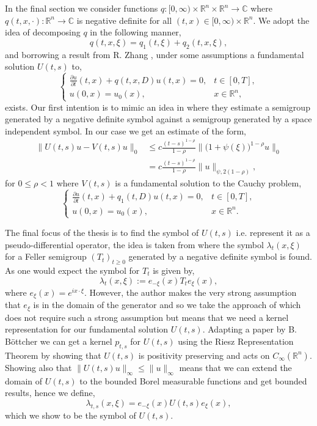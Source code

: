 \documentclass[a4paper, 12pt]{report}
\theoremstyle{cor}
\theoremstyle{remark}
\theoremstyle{definition}
\begin{document}
In the final section we consider functions $q : [0, \infty) \times \mathbb{R}^n \times \mathbb{R}^n \to \mathbb{C}$ where $q(t, x, \cdot) : \mathbb{R}^n \to \mathbb{C}$ is negative definite for all $(t, x) \in [0, \infty) \times \mathbb{R}^n$.  We adopt the idea of decomposing $q$ in the following manner,
$$
q(t, x, \xi) = q_1(t, \xi) + q_2(t, x, \xi),
$$
and borrowing a result from R. Zhang \cite{RZ}, under some assumptions a fundamental solution $U(t, s)$ to,
$$
\begin{cases}
\frac{\partial u}{\partial t}(t, x) + q(t, x, D)u(t, x) = 0, & t \in [0, T],\\
u(0, x) = u_0(x), & x \in \mathbb{R}^n,
\end{cases}
$$
exists.  Our first intention is to mimic an idea in \cite{EstimatesPaper} where they estimate a semigroup generated by a negative definite symbol against a semigroup generated by a space independent symbol.  In our case we get an estimate of the form,
$$
\begin{aligned}
\|U(t, s)u - V(t, s)u\|_0 & \le c\frac{(t - s)^{1 - \rho}}{1 - \rho}\big\|\big(1 + \psi(\xi)\big)^{1 - \rho}u\big\|_0\\
& = c\frac{(t - s)^{1 - \rho}}{1 - \rho}\|u\|_{\psi, 2(1 - \rho)},
\end{aligned}
$$
for $0 \le \rho < 1$ where $V(t, s)$ is a fundamental solution to the Cauchy problem,
$$
\begin{cases}
\frac{\partial u}{\partial t}(t, x) + q_1(t, D)u(t, x) = 0, & t \in [0, T],\\
u(0, x) = u_0(x), & x \in \mathbb{R}^n.
\end{cases}
$$

The final focus of the thesis is to find the symbol of $U(t, s)$ i.e. represent it as a pseudo-differential operator, the idea is taken from \cite{SymbolPaper} where the symbol $\lambda_t(x, \xi)$ for a Feller semigroup $(T_t)_{t \ge 0}$ generated by a negative definite symbol is found.  As one would expect the symbol for $T_t$ is given by,
$$
\lambda_t(x, \xi) := e_{-\xi}(x)T_te_\xi(x),
$$
where $e_\xi(x) = e^{ix\cdot\xi}$.  However, the author makes the very strong assumption that $e_\xi$ is in the domain of the generator and so we take the approach of \cite{Conservative} which does not require such a strong assumption but means that we need a kernel representation for our fundamental solution $U(t, s)$.  Adapting a paper by B. B\"ottcher \cite{KernelPaper} we can get a kernel $p_{t, s}$ for $U(t, s)$ using the Riesz Representation Theorem by showing that $U(t, s)$ is positivity preserving and acts on $C_\infty(\mathbb{R}^n)$.  Showing also that $\|U(t, s)u\|_\infty \le \|u\|_\infty$ means that we can extend the domain of $U(t, s)$ to the bounded Borel measurable functions and get bounded results, hence we define,
$$
\lambda_{t, s}(x, \xi) = e_{-\xi}(x)U(t, s)e_\xi(x),
$$
which we show to be the symbol of $U(t, s)$.
\end{document}
